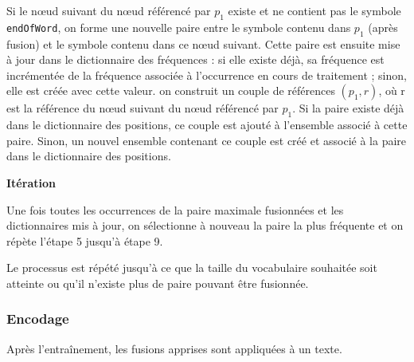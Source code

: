 \documentclass[12pt,a4paper]{report}
\begin{document}
\begin{enumerateFB}
\begin{itemizeFB}
			\item Si le nœud suivant du nœud référencé par $p_1$ existe et ne contient pas le symbole \texttt{endOfWord}, on forme une nouvelle paire entre le symbole contenu dans $p_1$ (après fusion) et le symbole contenu dans ce nœud suivant. Cette paire est ensuite mise à jour dans le dictionnaire des fréquences : si elle existe déjà, sa fréquence est incrémentée de la fréquence associée à l’occurrence en cours de traitement ; sinon, elle est créée avec cette valeur. on construit un couple de références $(p_1, r)$, où r est la référence du nœud suivant du nœud référencé par $p_1$. Si la paire existe déjà dans le dictionnaire des positions, ce couple est ajouté à l’ensemble associé à cette paire. Sinon, un nouvel ensemble contenant ce couple est créé et associé à la paire dans le dictionnaire des positions.
		\end{itemizeFB}
		
		\item \textbf{Itération}
		
		Une fois toutes les occurrences de la paire maximale fusionnées et les dictionnaires mis à jour, on sélectionne à nouveau la paire la plus fréquente et on répète l'étape 5 jusqu'à étape 9.
		
		Le processus est répété jusqu’à ce que la taille du vocabulaire souhaitée soit atteinte ou qu’il n’existe plus de paire pouvant être fusionnée.
	\end{enumerateFB}
	
	\subsubsection{Encodage}
	
	Après l’entraînement, les fusions apprises sont appliquées à un texte.
	
\end{document}
